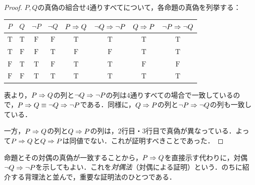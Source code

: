 \begin{tleftbar}
  \begin{proof}
    $P,Q$の真偽の組合せ$4$通りすべてについて，各命題の真偽を列挙する：
    \begin{center}
      \begin{tabular}{|c|c||c|c||c|c|c|c|} \hline
        $P$          & $Q$          & $\lnot P$    & $\lnot Q$    & $P \mathrel{\Rightarrow} Q$  & $\lnot Q \mathrel{\Rightarrow} \lnot P$ & $Q \mathrel{\Rightarrow} P$  & $\lnot P \mathrel{\Rightarrow} \lnot Q$ \\ \hline
        $\mathrm{T}$ & $\mathrm{T}$ & $\mathrm{F}$ & $\mathrm{F}$ & $\mathrm{T}$ & $\mathrm{T}$          & $\mathrm{T}$ & $\mathrm{T}$          \\ \hline
        $\mathrm{T}$ & $\mathrm{F}$ & $\mathrm{F}$ & $\mathrm{T}$ & $\mathrm{F}$ & $\mathrm{F}$          & $\mathrm{T}$ & $\mathrm{T}$          \\ \hline
        $\mathrm{F}$ & $\mathrm{T}$ & $\mathrm{T}$ & $\mathrm{F}$ & $\mathrm{T}$ & $\mathrm{T}$          & $\mathrm{F}$ & $\mathrm{F}$          \\ \hline
        $\mathrm{F}$ & $\mathrm{F}$ & $\mathrm{T}$ & $\mathrm{T}$ & $\mathrm{T}$ & $\mathrm{T}$          & $\mathrm{T}$ & $\mathrm{T}$          \\ \hline
      \end{tabular}
    \end{center}
    表より，$P \mathrel{\Rightarrow} Q$の列と$\lnot Q \mathrel{\Rightarrow} \lnot P$の列は$4$通りすべての場合で一致しているので，$P \mathrel{\Rightarrow} Q \equiv \lnot Q \mathrel{\Rightarrow} \lnot P$である．同様に，$Q \mathrel{\Rightarrow} P$の列と$\lnot P \mathrel{\Rightarrow} \lnot Q$の列も一致している．

    一方，$P \mathrel{\Rightarrow} Q$の列と$Q \mathrel{\Rightarrow} P$の列は，$2$行目・$3$行目で真偽が異なっている．よって$P \mathrel{\Rightarrow} Q$と$Q \mathrel{\Rightarrow} P$は同値でない．これが証明すべきことであった．
  \end{proof}
\end{tleftbar}

\begin{remark}[対偶と背理法]
  命題とその対偶の真偽が一致することから，$P \mathrel{\Rightarrow} Q$を直接示す代わりに，対偶$\lnot Q \mathrel{\Rightarrow} \lnot P$を示してもよい．これを\emph{対偶法}（対偶による証明）という．のちに紹介する背理法と並んで，重要な証明法のひとつである．
\end{remark}

